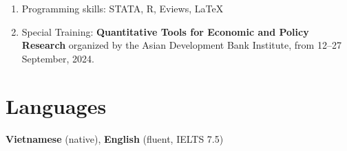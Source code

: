 \documentclass[10.5pt]{article}
\begin{document}
\begin{enumerate}
	\item Programming skills: STATA, R, Eviews, \LaTeX
	\item Special Training: \textbf{Quantitative Tools for Economic and Policy Research} organized by the Asian Development Bank Institute, from 12--27 September, 2024. 
\end{enumerate}


\section{Languages}

\textbf{Vietnamese} (native), \textbf{English} (fluent, IELTS 7.5)
\end{document}
